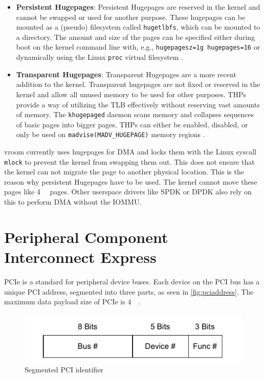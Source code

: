 \begin{itemize}
    \item \textbf{Persistent Hugepages}: Persistent Hugepages are reserved in the kernel and cannot be swapped or used for another purpose. These hugepages can be mounted as a (pseudo) filesystem called \texttt{hugetlbfs}, which can be mounted to a directory. The amount and size of the pages can be specified either during boot on the kernel command line with, e.g., \texttt{hugepagesz=1g hugepages=16} or dynamically using the Linux \texttt{proc} virtual filesystem \cite{hugetlbkerneldocs}.
    \item \textbf{Transparent Hugepages}: Transparent Hugepages are a more recent addition to the kernel. Transparent hugepages are not fixed or reserved in the kernel and allow all unused memory to be used for other purposes. THPs provide a way of utilizing the TLB effectively without reserving vast amounts of memory. The \texttt{khugepaged} daemon scans memory and collapses sequences of basic pages into bigger pages. THPs can either be enabled, disabled, or only be used on \texttt{madvise(MADV\_HUGEPAGE)} memory regions \cite{transhugekerneldocs}.
\end{itemize}

vroom currently uses hugepages for DMA and locks them with the Linux syscall \texttt{mlock} to prevent the kernel from swapping them out. This does not ensure that the kernel can not migrate the page to another physical location. This is the reason why persistent Hugepages have to be used. The kernel cannot move these pages like \qty{4}{\kibi\byte} pages. Other userspace drivers like SPDK or DPDK also rely on this to perform DMA without the IOMMU.

\section{Peripheral Component Interconnect Express}
PCIe is a standard for peripheral device buses. Each device on the PCI bus has a unique PCI address, segmented into three parts, as seen in \autoref{fig:pciaddress}. The maximum data payload size of PCIe is \qty{4}{\kibi\byte}.

\begin{figure}[H]
    \centering
    \includegraphics[width=.7\textwidth]{figures/pciaddress.pdf}
    \caption{Segmented PCI identifier}
    \label{fig:pciaddress}
\end{figure}

